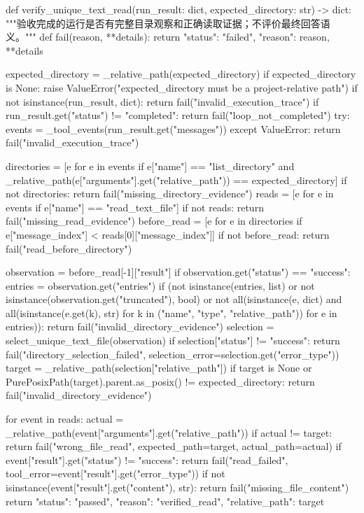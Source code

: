 \begin{Code}
def verify_unique_text_read(run_result: dict, expected_directory: str) -> dict:
    """验收完成的运行是否有完整目录观察和正确读取证据；不评价最终回答语义。"""
    def fail(reason, **details):
        return {"status": "failed", "reason": reason, **details}

    expected_directory = _relative_path(expected_directory)
    if expected_directory is None:
        raise ValueError("expected_directory must be a project-relative path")
    if not isinstance(run_result, dict):
        return fail("invalid_execution_trace")
    if run_result.get("status") != "completed":
        return fail("loop_not_completed")
    try:
        events = _tool_events(run_result.get("messages"))
    except ValueError:
        return fail("invalid_execution_trace")

    directories = [e for e in events if e["name"] == "list_directory"
                   and _relative_path(e["arguments"].get("relative_path")) == expected_directory]
    if not directories:
        return fail("missing_directory_evidence")
    reads = [e for e in events if e["name"] == "read_text_file"]
    if not reads:
        return fail("missing_read_evidence")
    before_read = [e for e in directories if e["message_index"] < reads[0]["message_index"]]
    if not before_read:
        return fail("read_before_directory")

    observation = before_read[-1]["result"]
    if observation.get("status") == "success":
        entries = observation.get("entries")
        if (not isinstance(entries, list) or not isinstance(observation.get("truncated"), bool)
                or not all(isinstance(e, dict) and all(isinstance(e.get(k), str)
                           for k in ("name", "type", "relative_path")) for e in entries)):
            return fail("invalid_directory_evidence")
    selection = select_unique_text_file(observation)
    if selection["status"] != "success":
        return fail("directory_selection_failed", selection_error=selection.get("error_type"))
    target = _relative_path(selection["relative_path"])
    if target is None or PurePosixPath(target).parent.as_posix() != expected_directory:
        return fail("invalid_directory_evidence")

    for event in reads:
        actual = _relative_path(event["arguments"].get("relative_path"))
        if actual != target:
            return fail("wrong_file_read", expected_path=target, actual_path=actual)
        if event["result"].get("status") != "success":
            return fail("read_failed", tool_error=event["result"].get("error_type"))
        if not isinstance(event["result"].get("content"), str):
            return fail("missing_file_content")
    return {"status": "passed", "reason": "verified_read", "relative_path": target}
\end{Code}


